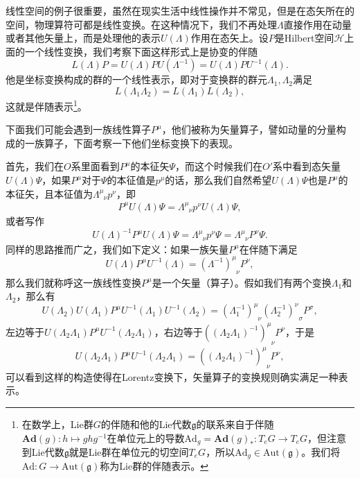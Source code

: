 \documentclass[9pt]{extbook}
\begin{document}

线性空间的例子很重要，虽然在现实生活中线性操作并不常见，但是在态矢所在的空间，物理算符可都是线性变换。在这种情况下，我们不再处理$\Lambda$直接作用在动量或者其他矢量上，而是处理他的表示$U(\Lambda)$作用在态矢上。设$P$是Hilbert空间$\mathcal{H}$上面的一个线性变换，我们考察下面这样形式上是协变的伴随
\[
	L(\Lambda)P=U(\Lambda) P U(\Lambda^{-1})=U(\Lambda) P U^{-1}(\Lambda).
\]
他是坐标变换构成的群的一个线性表示，即对于变换群的群元$\Lambda_1,\Lambda_2$满足
\[
	L(\Lambda_1\Lambda_2)=L(\Lambda_1)L(\Lambda_2),
\]
这就是伴随表示\footnote{在数学上，Lie群$G$的伴随和他的Lie代数$\mathfrak{g}$的联系来自于伴随$\bm{Ad}(g):h\mapsto ghg^{-1}$在单位元上的导数$\mathrm{Ad}_g=\bm{Ad}(g)_*:T_eG\to T_eG$，但注意到Lie代数$\mathfrak{g}$就是Lie群在单位元的切空间$T_eG$，所以$\mathrm{Ad}_g\in \mathrm{Aut}(\mathfrak{g})$。我们将$\mathrm{Ad}:G\to \mathrm{Aut}(\mathfrak{g})$称为Lie群的伴随表示。}。


下面我们可能会遇到一族线性算子$P^\mu$，他们被称为矢量算子，譬如动量的分量构成的一族算子，下面考察一下他们坐标变换下的表现。

首先，我们在$O$系里面看到$P^\mu$的本征矢$\Psi$，而这个时候我们在$O'$系中看到态矢量$U(\Lambda)\Psi$，如果$P^\mu$对于$\Psi$的本征值是$p^\mu$的话，那么我们自然希望$U(\Lambda)\Psi$也是$P^\mu$的本征矢，且本征值为$\Lambda^\mu_{\phantom{\mu}\nu}p^\nu$，即
\[
	P^\mu U(\Lambda)\Psi=\Lambda^\mu_{\phantom{\mu}\nu}p^\nu U(\Lambda)\Psi,
\]
或者写作
\[
	U(\Lambda)^{-1}P^\mu U(\Lambda)\Psi=\Lambda^\mu_{\phantom{\mu}\nu}p^\nu \Psi=\Lambda^\mu_{\phantom{\mu}\nu}P^\nu \Psi.
\]
同样的思路推而广之，我们如下定义：如果一族矢量$P^\mu$在伴随下满足
\[
	U(\Lambda) P^\mu U^{-1}(\Lambda)=(\Lambda^{-1})^\mu_{\phantom{\mu}\nu}P^\nu,
\]
那么我们就称呼这一族线性变换$P^\mu$是一个矢量（算子）。假如我们有两个变换$\Lambda_1$和$\Lambda_2$，那么有
\[
	U(\Lambda_2)U(\Lambda_1) P^\mu U^{-1}(\Lambda_1)U^{-1}(\Lambda_2)=(\Lambda_1^{-1})^\mu_{\phantom{\mu}\nu}(\Lambda_2^{-1})^\nu_{\phantom{\mu}\sigma}P^\sigma,
\]
左边等于$U(\Lambda_2\Lambda_1) P^\mu U^{-1}(\Lambda_2\Lambda_1)$，右边等于$\left((\Lambda_2\Lambda_1)^{-1}\right)^\mu_{\phantom{\mu}\nu}P^\nu$，于是
\[
U(\Lambda_2\Lambda_1) P^\mu U^{-1}(\Lambda_2\Lambda_1)=\left((\Lambda_2\Lambda_1)^{-1}\right)^\mu_{\phantom{\mu}\nu}P^\nu,
\]
可以看到这样的构造使得在Lorentz变换下，矢量算子的变换规则确实满足一种表示。
\end{document}
